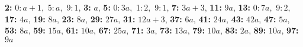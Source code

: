 \textsf{\bfseries 2:} 0:\,$a + 1$,\ 5:\,$a$,\ 9:\,$1$, \textsf{\bfseries 3:} $a$, \textsf{\bfseries 5:} 0:\,$3a$,\ 1:\,$2$,\ 9:\,$1$, \textsf{\bfseries 7:} $3a + 3$, \textsf{\bfseries 11:} $9a$, \textsf{\bfseries 13:} 0:\,$7a$,\ 9:\,$2$, \textsf{\bfseries 17:} $4a$, \textsf{\bfseries 19:} $8a$, \textsf{\bfseries 23:} $8a$, \textsf{\bfseries 29:} $27a$, \textsf{\bfseries 31:} $12a + 3$, \textsf{\bfseries 37:} $6a$, \textsf{\bfseries 41:} $24a$, \textsf{\bfseries 43:} $42a$, \textsf{\bfseries 47:} $5a$, \textsf{\bfseries 53:} $8a$, \textsf{\bfseries 59:} $15a$, \textsf{\bfseries 61:} $10a$, \textsf{\bfseries 67:} $25a$, \textsf{\bfseries 71:} $3a$, \textsf{\bfseries 73:} $13a$, \textsf{\bfseries 79:} $10a$, \textsf{\bfseries 83:} $2a$, \textsf{\bfseries 89:} $10a$, \textsf{\bfseries 97:} $9a$